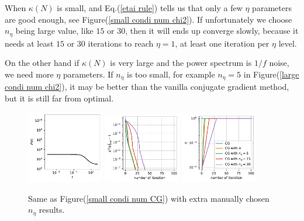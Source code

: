 \documentclass[twocolumn,linenumbers]{aastex631}
\begin{document}
When $\kappa(N)$ is small, and Eq.(\ref{etai rule}) tells us that only a few
$\eta$ parameters are good enough, see Figure(\ref{small condi num chi2}).
If unfortunately we choose $n_{\eta}$ being large value, like $15$ or $30$,
then it will ends up converge slowly, because it needs at least $15$ or $30$
iterations to reach $\eta=1$, at least one iteration per $\eta$ level.

On the other hand if $\kappa(N)$ is very large and the power spectrum is $1/f$
noise, we need more $\eta$ parameters.
If $n_{\eta}$ is too small, for example $n_{\eta}=5$ in
Figure(\ref{large condi num chi2}), it may be better than the vanilla conjugate
gradient method, but it is still far from optimal.


\begin{figure}[htb!]
\centering
\includegraphics[width=0.3\textwidth]{0.1/small_condition_num/P_f.pdf}
\includegraphics[width=0.3\textwidth]{0.1/small_condition_num/chi2.pdf}
\includegraphics[width=0.3\textwidth]{0.1/small_condition_num/eta.pdf}
\caption{Same as Figure(\ref{small condi num CG}) with extra manually chosen 
    $n_{\eta}$ results.
}
\label{small condi num}
\end{figure}
\end{document}
